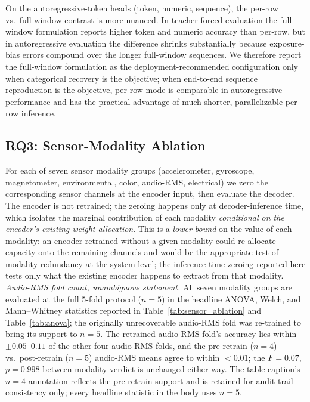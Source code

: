 \documentclass[sensors,article,submit,moreauthors,pdftex]{Definitions/mdpi}
\begin{document}
On the autoregressive-token heads (token, numeric, sequence), the per-row vs.\ full-window contrast is more nuanced. In teacher-forced evaluation the full-window formulation reports higher token and numeric accuracy than per-row, but in autoregressive evaluation the difference shrinks substantially because exposure-bias errors compound over the longer full-window sequences. We therefore report the full-window formulation as the deployment-recommended configuration only when categorical recovery is the objective; when end-to-end sequence reproduction is the objective, per-row mode is comparable in autoregressive performance and has the practical advantage of much shorter, parallelizable per-row inference.

\subsection{RQ3: Sensor-Modality Ablation}
\label{sec:abl-sensors}
For each of seven sensor modality groups (accelerometer, gyroscope, magnetometer, environmental, color, audio-RMS, electrical) we zero the corresponding sensor channels at the encoder input, then evaluate the decoder. The encoder is not retrained; the zeroing happens only at decoder-inference time, which isolates the marginal contribution of each modality \emph{conditional on the encoder's existing weight allocation}. This is a \emph{lower bound} on the value of each modality: an encoder retrained without a given modality could re-allocate capacity onto the remaining channels and would be the appropriate test of modality-redundancy at the system level; the inference-time zeroing reported here tests only what the existing encoder happens to extract from that modality. \emph{Audio-RMS fold count, unambiguous statement.} All seven modality groups are evaluated at the full 5-fold protocol ($n=5$) in the headline ANOVA, Welch, and Mann--Whitney statistics reported in Table~\ref{tab:sensor_ablation} and Table~\ref{tab:anova}; the originally unrecoverable audio-RMS fold was re-trained to bring its support to $n=5$. The retrained audio-RMS fold's accuracy lies within $\pm 0.05$--$0.11$ of the other four audio-RMS folds, and the pre-retrain ($n=4$) vs.\ post-retrain ($n=5$) audio-RMS means agree to within $<\!0.01$; the $F\!=\!0.07$, $p\!=\!0.998$ between-modality verdict is unchanged either way. The table caption's $n=4$ annotation reflects the pre-retrain support and is retained for audit-trail consistency only; every headline statistic in the body uses $n=5$.
\end{document}
